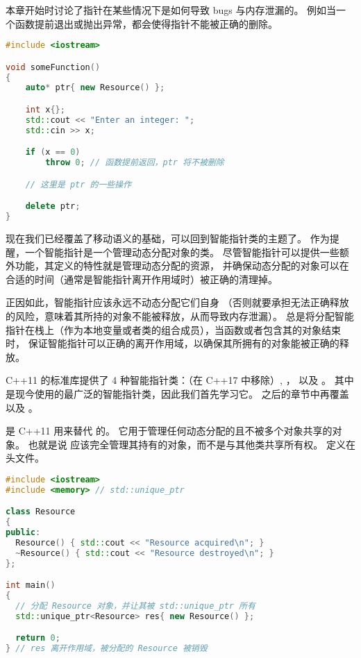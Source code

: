 \documentclass[../../LearnCpp.tex]{subfiles}
\begin{document}

本章开始时讨论了指针在某些情况下是如何导致 bugs 与内存泄漏的。
例如当一个函数提前退出或抛出异常，都会使得指针不能被正确的删除。

\begin{lstlisting}[language=C++]
#include <iostream>

void someFunction()
{
    auto* ptr{ new Resource() };

    int x{};
    std::cout << "Enter an integer: ";
    std::cin >> x;

    if (x == 0)
        throw 0; // 函数提前返回，ptr 将不被删除

    // 这里是 ptr 的一些操作

    delete ptr;
}
\end{lstlisting}

现在我们已经覆盖了移动语义的基础，可以回到智能指针类的主题了。
作为提醒，一个智能指针是一个管理动态分配对象的类。
尽管智能指针可以提供一些额外功能，其定义的特性就是管理动态分配的资源，
并确保动态分配的对象可以在合适的时间（通常是智能指针离开作用域时）被正确的清理掉。

正因如此，智能指针应该永远不动态分配它们自身
（否则就要承担无法正确释放的风险，意味着其所持的对象不能被释放，从而导致内存泄漏）。
总是将分配智能指针在栈上（作为本地变量或者类的组合成员），当函数或者包含其的对象结束时，
保证智能指针可以正确的离开作用域，以确保其所拥有的对象能被正确的释放。

C++11 的标准库提供了 4 种智能指针类：（在 C++17 中移除）,
，  以及 。
其中  是现今使用的最广泛的智能指针类，因此我们首先学习它。
之后的章节中再覆盖  以及 。

 是 C++11 用来替代  的。
它用于管理任何动态分配的且不被多个对象共享的对象。
也就是说  应该完全管理其持有的对象，而不是与其他类共享所有权。
 定义在  头文件。

\begin{lstlisting}[language=C++]
#include <iostream>
#include <memory> // std::unique_ptr

class Resource
{
public:
  Resource() { std::cout << "Resource acquired\n"; }
  ~Resource() { std::cout << "Resource destroyed\n"; }
};

int main()
{
  // 分配 Resource 对象，并让其被 std::unique_ptr 所有
  std::unique_ptr<Resource> res{ new Resource() };

  return 0;
} // res 离开作用域，被分配的 Resource 被销毁
\end{lstlisting}
\end{document}
